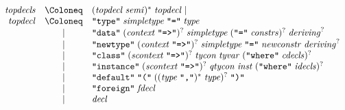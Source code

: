 \begin{align*}
  \begin{array}{rcl}
    \mathit{topdecls}
    & \Coloneq & (\mathit{topdecl}\; \mathit{semi})^*\; \mathit{topdecl} \mid \\
    \mathit{topdecl}
    & \Coloneq & \text{\texttt{\textquotedbl type\textquotedbl}}\; \mathit{simpletype}\; \text{\texttt{\textquotedbl =\textquotedbl}}\; \mathit{type} \\
    & \mid & \text{\texttt{\textquotedbl data\textquotedbl}}\; (\mathit{context}\; \text{\texttt{\textquotedbl =>\textquotedbl}})^?\; \mathit{simpletype}\; (\text{\texttt{\textquotedbl =\textquotedbl}}\; \mathit{constrs})^?\; \mathit{deriving}^? \\
    & \mid & \text{\texttt{\textquotedbl newtype\textquotedbl}}\; (\mathit{context}\; \text{\texttt{\textquotedbl =>\textquotedbl}})^?\; \mathit{simpletype}\; \text{\texttt{\textquotedbl =\textquotedbl}}\; \mathit{newconstr}\; \mathit{deriving}^? \\
    & \mid & \text{\texttt{\textquotedbl class\textquotedbl}}\; (\mathit{scontext}\; \text{\texttt{\textquotedbl =>\textquotedbl}})^?\; \mathit{tycon}\; \mathit{tyvar}\; (\text{\texttt{\textquotedbl where\textquotedbl}}\; \mathit{cdecls})^? \\
    & \mid & \text{\texttt{\textquotedbl instance\textquotedbl}}\; (\mathit{scontext}\; \text{\texttt{\textquotedbl =>\textquotedbl}})^?\; \mathit{qtycon}\; \mathit{inst}\; (\text{\texttt{\textquotedbl where\textquotedbl}}\; \mathit{idecls})^? \\
    & \mid & \text{\texttt{\textquotedbl default\textquotedbl}}\; \text{\texttt{\textquotedbl(\textquotedbl}}\; ((\mathit{type}\; \text{\texttt{\textquotedbl,\textquotedbl}})^*\; \mathit{type})^?\; \text{\texttt{\textquotedbl)\textquotedbl}} \\
    & \mid & \text{\texttt{\textquotedbl foreign\textquotedbl}}\; \mathit{fdecl} \\
    & \mid & \mathit{decl}
  \end{array}
\end{align*}

